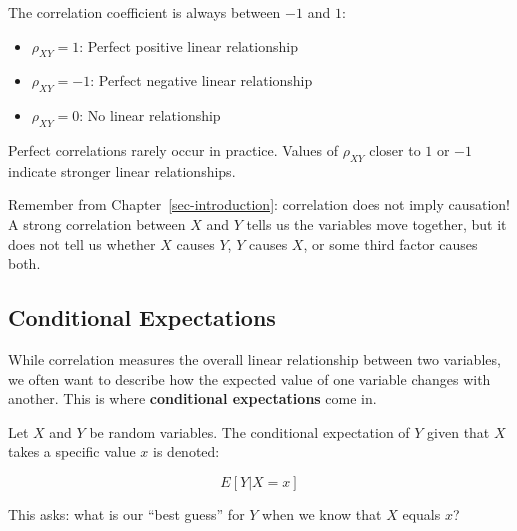 \documentclass[
  letterpaper,
  DIV=11,
  numbers=noendperiod]{scrreprt}
\providecommand{\tightlist}{%
  \setlength{\itemsep}{0pt}\setlength{\parskip}{0pt}}
\begin{document}
The correlation coefficient is always between \(-1\) and \(1\):

\begin{itemize}
\tightlist
\item
  \(\rho_{XY} = 1\): Perfect positive linear relationship
\item
  \(\rho_{XY} = -1\): Perfect negative linear relationship
\item
  \(\rho_{XY} = 0\): No linear relationship
\end{itemize}

Perfect correlations rarely occur in practice. Values of \(\rho_{XY}\)
closer to \(1\) or \(-1\) indicate stronger linear relationships.

\begin{tcolorbox}[enhanced jigsaw, arc=.35mm, bottomrule=.15mm, bottomtitle=1mm, breakable, colback=white, colbacktitle=quarto-callout-note-color!10!white, colframe=quarto-callout-note-color-frame, coltitle=black, left=2mm, leftrule=.75mm, opacityback=0, opacitybacktitle=0.6, rightrule=.15mm, title=\textcolor{quarto-callout-note-color}{\faInfo}\hspace{0.5em}{Correlation vs.~Causation}, titlerule=0mm, toprule=.15mm, toptitle=1mm]

Remember from Chapter~\ref{sec-introduction}: correlation does not imply
causation! A strong correlation between \(X\) and \(Y\) tells us the
variables move together, but it does not tell us whether \(X\) causes
\(Y\), \(Y\) causes \(X\), or some third factor causes both.

\end{tcolorbox}

\subsection{Conditional Expectations}\label{conditional-expectations-1}

While correlation measures the overall linear relationship between two
variables, we often want to describe how the expected value of one
variable changes with another. This is where \textbf{conditional
expectations} come in.

Let \(X\) and \(Y\) be random variables. The conditional expectation of
\(Y\) given that \(X\) takes a specific value \(x\) is denoted:

\[
E[Y | X = x]
\]

This asks: what is our ``best guess'' for \(Y\) when we know that \(X\)
equals \(x\)?
\end{document}
